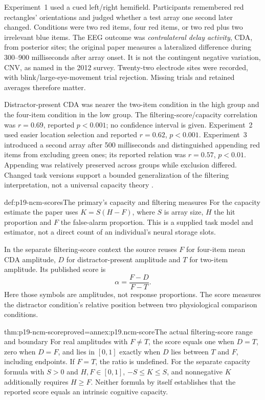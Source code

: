 Experiment~1 used a cued left/right hemifield. Participants remembered
red rectangles' orientations and judged whether a test array one
second later changed. Conditions were two red items, four red items,
or two red plus two irrelevant blue items. The EEG outcome was
\emph{contralateral delay activity}, CDA, from posterior sites;
the original paper measures a lateralized difference during
300--900 milliseconds after array onset. It is not the contingent
negative variation, CNV, as named in the 2012 survey. Twenty-two
electrode sites were recorded, with blink/large-eye-movement trial
rejection. Missing trials and retained averages therefore matter.

Distractor-present CDA was nearer the two-item condition in the
high group and the four-item condition in the low group. The
filtering-score/capacity correlation was \(r=0.69\), reported
\(p<0.001\); no confidence interval is given. Experiment~2
used easier location selection and reported \(r=0.62\),
\(p<0.001\). Experiment~3 introduced a second array after
500 milliseconds and distinguished appending red items from
excluding green ones; its reported relation was \(r=0.57\),
\(p<0.01\). Appending was relatively preserved across groups
while exclusion differed. Changed task versions support a bounded
generalization of the filtering interpretation, not a universal
capacity theory \cite[pp.~500--502]{VogelEtAl2005Selection}.

\begin{hbdefinition}{def:p19-ncm-scores}{The primary's capacity and filtering measures}
For the capacity estimate the paper uses \(K=S(H-F)\), where
\(S\) is array size, \(H\) the hit proportion and \(F\)
the false-alarm proportion. This is a supplied task model and
estimator, not a direct count of an individual's neural storage slots.

In the separate filtering-score context the source reuses \(F\)
for four-item mean CDA amplitude, \(D\) for distractor-present
amplitude and \(T\) for two-item amplitude. Its published score is
\[
                       \alpha=\frac{F-D}{F-T}.
\]
Here those symbols are amplitudes, not response proportions.
The score measures the distractor condition's relative position
between two physiological comparison conditions.
\end{hbdefinition}

\begin{hbtheorem}{thm:p19-ncm-score}{proved=annex:p19.ncm-score}{The actual filtering-score range and boundary}
For real amplitudes with \(F\ne T\), the score equals one
when \(D=T\), zero when \(D=F\), and lies in \([0, 1]\)
exactly when \(D\) lies between \(T\) and \(F\), including
endpoints. If \(F=T\), the ratio is undefined. For the separate
capacity formula with \(S>0\) and \(H, F\in[0, 1]\),
\(-S\leq K\leq S\), and nonnegative \(K\) additionally
requires \(H\geq F\). Neither formula by itself establishes
that the reported score equals an intrinsic cognitive capacity.
\end{hbtheorem}

